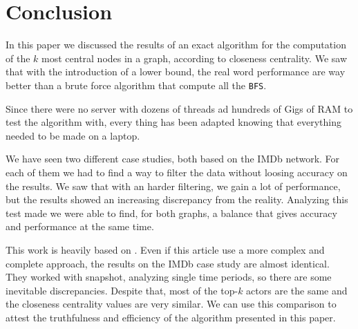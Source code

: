 \section{Conclusion}

In this paper we discussed the results of an exact algorithm for the computation of the $k$ most central nodes in a graph, according to closeness centrality. We saw that with the introduction of a lower bound, the real word performance are way better than a brute force algorithm that compute all the \texttt{BFS}. \s

\nd Since there were no server with dozens of threads ad hundreds of Gigs of RAM to test the algorithm with, every thing has been adapted knowing that everything needed to be made on a laptop. \s

\nd We have seen two different case studies, both based on the IMDb network. For each of them we had to find a way to filter the data without loosing accuracy on the results. We saw that with an harder filtering, we gain a lot of performance, but the results showed an increasing discrepancy from the reality. Analyzing this test made we were able to find, for both graphs, a balance that gives accuracy and performance at the same time.

\s \nd This work is heavily based on \cite{DBLP:journals/corr/BergaminiBCMM17}. Even if this article use a more complex and complete approach, the results on the IMDb case study are almost identical. They worked with snapshot, analyzing single time periods, so there are some inevitable discrepancies. Despite that, most of the top-$k$ actors are the same and the closeness centrality values are very similar. We can use this comparison to attest the truthfulness and efficiency of the algorithm presented in this paper.

